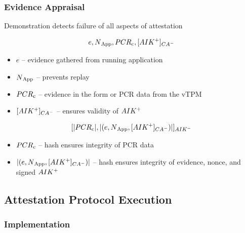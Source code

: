 \documentclass{beamer}
\def \app {App}
\def \pcomp {PCR\textsubscript{c}}
\def \eve {e}
\def \cacert {\sign {\public{AIK}}{CA}}
\def \exdata {\hash{(\eve, \nonce{\app}, \cacert ) }}
\begin{document}
\begin{frame}
  \frametitle{Evidence Appraisal}

  \begin{center}
    {\color{kublue}Demonstration detects failure of all aspects of attestation}
  \end{center}

  \[\eve, \nonce{\app}, \pcomp, \cacert\]

  \begin{itemize}
  \item $\eve$ -- evidence gathered from running application
  \item $\nonce{\app}$ -- prevents replay
  \item $\pcomp$ -- evidence in the form or PCR data from the vTPM
  \item $\cacert$ -- ensures validity of $AIK^{+}$
  \end{itemize}

  \[\sign{\hash{\pcomp}, \exdata}{AIK}\]

  \begin{itemize}
  \item $\pcomp$ -- hash ensures integrity of PCR data
  \item $\exdata$ -- hash ensures integrity of evidence, nonce, and
    signed $AIK^{+}$
  \end{itemize}

\end{frame}

\subsection{Attestation Protocol Execution}

\begin{frame}[fragile]
  \frametitle{Implementation}
  \begin{tiny}
  \begin{columns}[T]
  \begin{column}{.48\textwidth}
  \begin{center}
  
  \end{center}
  \end{column}
  \vrule{}
  \begin{column}{.48\textwidth}
  \begin{center}
  
  \end{center}
  \end{column}
  \end{columns}
  \end{tiny}
\end{frame}
\end{document}
